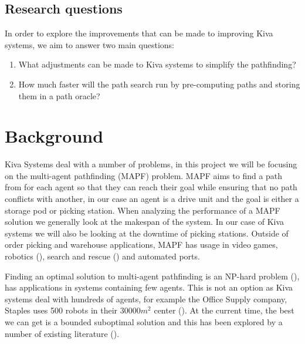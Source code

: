 \documentclass[a4paper,11pt]{article}
\begin{document}
\subsection{Research questions}
In order to explore the improvements that can be made to improving Kiva systems, we aim to answer two main questions:

\begin{enumerate}
	\item What adjustments can be made to Kiva systems to simplify the pathfinding?

\item How much faster will the path search run by pre-computing paths and storing them in a path oracle?

\end{enumerate}

\section{Background}
\label{background}

Kiva Systems deal with a number of problems, in this project we will be focusing on the multi-agent pathfinding (MAPF) problem. MAPF aims to find a path from for each agent so that they can reach their goal while ensuring that no path conflicts with another, in our case an agent is a drive unit and the goal is either a storage pod or picking station. When analyzing the performance of a MAPF solution we generally look at the makespan of the system. In our case of Kiva systems we will also be looking at the downtime of picking stations. Outside of order picking and warehouse applications,  MAPF has usage in video games, robotics (\cite{bennewitz2002finding}), search and rescue (\cite{konolige2006centibots}) and automated ports.

Finding an optimal solution to multi-agent pathfinding is an NP-hard problem (\cite{yu2013structure}), has applications in systems containing few agents. This is not an option as Kiva systems deal with hundreds of agents, for example the Office Supply company, Staples uses 500 robots in their 30000$m^{2}$ center (\cite{guizzo2008three}). At the current time, the best we can get is a bounded suboptimal solution and this has been explored by a number of existing literature (\cite{cohen2016bounded}).
\end{document}
